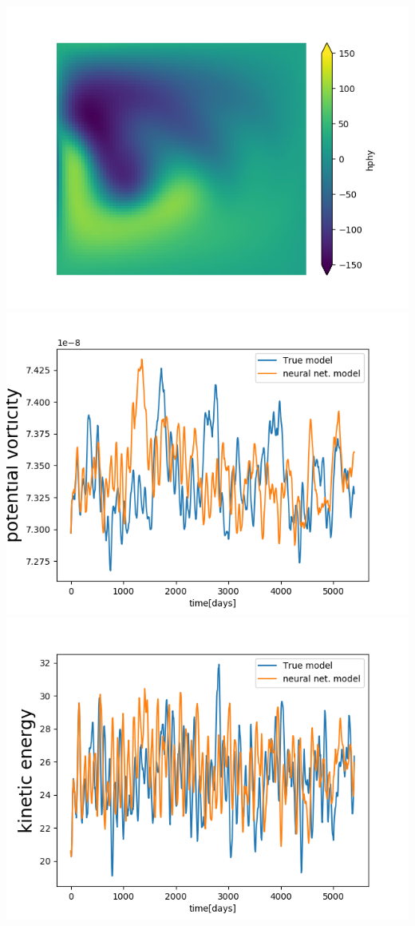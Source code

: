 \documentclass[handout]{beamer}
\begin{document}
\begin{frame}
\begin{columns}
\includegraphics[width=\textwidth]{./fig/L3/mean-hphy1.png}\\
\includegraphics[width=\textwidth]{./fig/L3/evol-PV.png}
\includegraphics[width=\textwidth]{./fig/L3/evol-EC.png}\\

\end{columns}
\end{frame}
\end{document}
